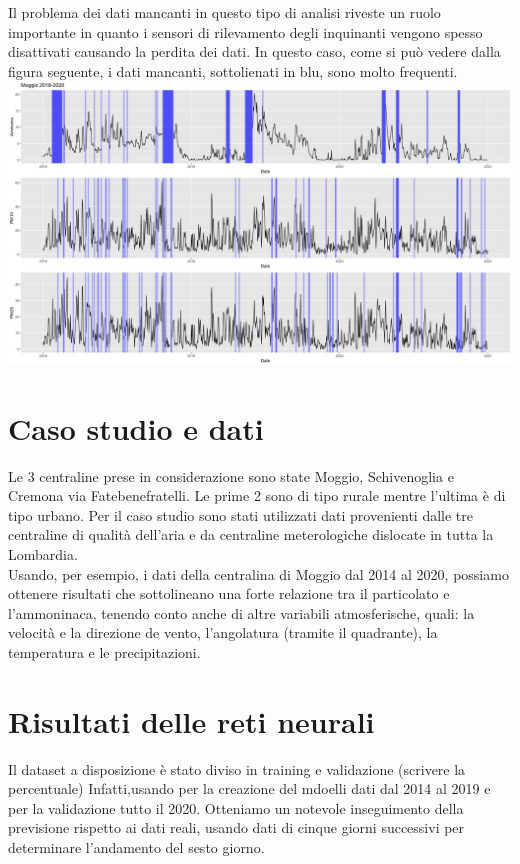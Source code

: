 \documentclass{article}
\begin{document}
Il problema dei dati mancanti in questo tipo di analisi riveste un ruolo importante
in quanto i sensori di rilevamento degli inquinanti vengono spesso disattivati causando la perdita 
dei dati. In questo caso, come si può vedere dalla figura seguente, i dati mancanti, sottolienati in blu, sono molto frequenti.
\\\includegraphics[scale=0.4]{Immagini/Moggio 2018-2020.jpeg}
    
\section{Caso studio e dati}

Le 3 centraline prese in considerazione sono state Moggio, Schivenoglia e 
Cremona via Fatebenefratelli. Le prime 2 sono di tipo rurale mentre l'ultima è di tipo urbano.
Per il caso studio sono stati utilizzati dati provenienti dalle 
tre centraline di qualità dell'aria e da centraline meterologiche dislocate in tutta la Lombardia.
\\Usando, per esempio, i dati della centralina di Moggio dal 2014 al 2020, possiamo ottenere risultati 
che sottolineano una forte relazione tra il particolato e l'ammoninaca, tenendo conto anche di altre variabili
atmosferische, quali: la velocità e la direzione de vento, l'angolatura (tramite il quadrante), la temperatura e le precipitazioni.
\section{Risultati delle reti neurali}
Il dataset a disposizione è stato diviso in training e validazione (scrivere la percentuale)
Infatti,usando per la creazione del mdoelli dati dal 2014 al 2019 e per la 
validazione tutto il 2020. Otteniamo un notevole inseguimento della previsione rispetto ai dati reali, 
usando dati di cinque giorni successivi per determinare l'andamento del sesto giorno.
\end{document}
